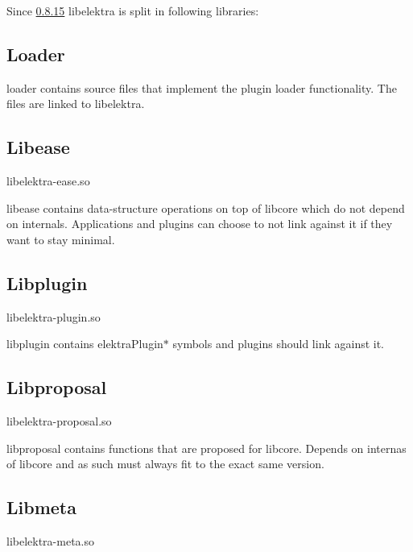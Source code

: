 Since \hyperlink{doc_decisions_library_split_md}{0.8.15} libelektra is split in following libraries\+:



\subsection*{Loader}

loader contains source files that implement the plugin loader functionality. The files are linked to libelektra.

\subsection*{Libease}

\begin{DoxyVerb}libelektra-ease.so
\end{DoxyVerb}


libease contains data-\/structure operations on top of libcore which do not depend on internals. Applications and plugins can choose to not link against it if they want to stay minimal.

\subsection*{Libplugin}

\begin{DoxyVerb}libelektra-plugin.so
\end{DoxyVerb}


libplugin contains elektra\+Plugin$\ast$ symbols and plugins should link against it.

\subsection*{Libproposal}

\begin{DoxyVerb}libelektra-proposal.so
\end{DoxyVerb}


libproposal contains functions that are proposed for libcore. Depends on internas of libcore and as such must always fit to the exact same version.

\subsection*{Libmeta}

\begin{DoxyVerb}libelektra-meta.so
\end{DoxyVerb}


